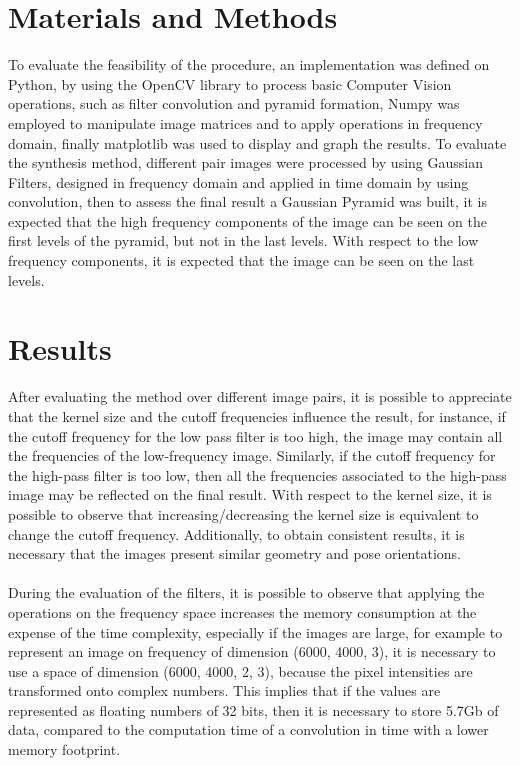 \documentclass{article}
\begin{document}
\section{Materials and Methods}
To evaluate the feasibility of the procedure, an implementation was defined on Python, by using the OpenCV library to process basic Computer Vision operations, such as filter convolution and pyramid formation, Numpy was employed to manipulate image matrices and to apply operations in frequency domain, finally matplotlib was used to display and graph the results. To evaluate the synthesis method, different pair images were processed by using Gaussian Filters, designed in frequency domain and applied in time domain by using convolution, then to assess the final result a Gaussian Pyramid was built, it is expected that the high frequency components of the image can be seen on the first levels of the pyramid, but not in the last levels. With respect to the low frequency components, it is expected that the image can be seen on the last levels.


\section{Results}
After evaluating the method over different image pairs, it is possible to appreciate that the kernel size and the cutoff frequencies influence the result, for instance, if the cutoff frequency for the low pass filter is too high, the image may contain all the frequencies of the low-frequency image. Similarly, if the cutoff frequency for the high-pass filter is too low, then all the frequencies associated to the high-pass image may be reflected on the final result. With respect to the kernel size, it is possible to observe that increasing/decreasing the kernel size is equivalent to change the cutoff frequency. Additionally, to obtain consistent results, it is necessary that the images present similar geometry and pose orientations.
\\
\\
During the evaluation of the filters, it is possible to observe that applying the operations on the frequency space increases the memory consumption at the expense of the time complexity, especially if the images are large, for example to represent an image on frequency of dimension (6000, 4000, 3), it is necessary to use a space of dimension (6000, 4000, 2, 3), because the pixel intensities are transformed onto complex numbers. This implies that if the values are represented as floating numbers of 32 bits, then it is necessary to store 5.7Gb of data, compared to the computation time of a convolution in time with a lower memory footprint.
\end{document}
